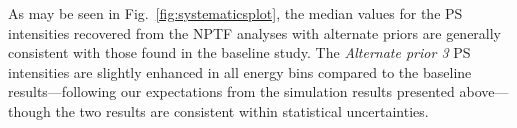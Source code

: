 As may be seen in Fig.~\ref{fig:systematicsplot}, the median values for the PS intensities recovered from the NPTF analyses with alternate priors are generally consistent with those found in the baseline study.  The {\it Alternate prior 3} PS intensities are slightly enhanced in all energy bins compared to the baseline results---following our expectations from the simulation results presented above---though the two results are consistent within statistical uncertainties.  



